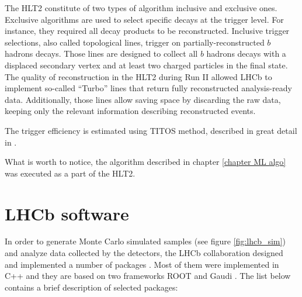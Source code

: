 The HLT2 constitute of two types of algorithm inclusive and exclusive ones. Exclusive algorithms are used to select specific decays at the trigger level. For instance, they required all decay products to be reconstructed. 
Inclusive trigger selections, also called topological lines, trigger on partially-reconstructed $b$ hadrons decays. Those lines are designed to collect all $b$ hadrons decays with a displaced secondary vertex and at least two charged particles in the final state.
The quality of reconstruction in the HLT2 during Run II allowed LHCb to implement so-called “Turbo” lines that return fully reconstructed analysis-ready data. Additionally, those lines allow saving space by discarding the raw data, keeping only the relevant information describing reconstructed events. 

The trigger efficiency is estimated using TITOS method, described in great detail in \cite{trigger_eff}. 

What is worth to notice, the algorithm described in chapter \ref{chapter ML algo} was executed as a part of the HLT2. 

\section{LHCb software}

In order to generate Monte Carlo simulated samples (see figure \ref{fig:lhcb_sim}) and analyze data collected by the detectors, the LHCb collaboration designed and implemented a number of packages \cite{lhcb_software}. Most of them were implemented in  C++ and they are based on two frameworks ROOT \cite{root} and Gaudi \cite{gaudi}. The list below contains a brief description of selected packages:

